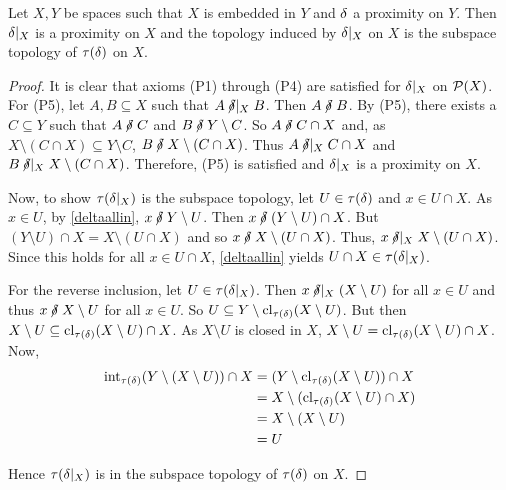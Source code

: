 \begin{proposition}
	\label{subprox}
	Let \( X,Y \) be spaces such that \( X \) is embedded in \( Y \) and \( \mathord{\delta} \) a proximity on \( Y \).  Then \( \mathord{\delta}|_X \) is a proximity on \( X \) and the topology induced by \( \mathord{\delta}|_X \) on \( X \) is the subspace topology of \( \tau(\mathord{\delta}) \) on \( X \).
\end{proposition}
\begin{proof}
	It is clear that axioms (P1) through (P4) are satisfied for \( \mathord{\delta}|_X \) on \( \mathcal{P}(X) \).  For (P5), let \( A,B \subseteq X \) such that \( A \nnearr{X} B \).  Then \( A \nnear B \).  By (P5), there exists a \( C \subseteq Y \) such that \( A \nnear C \) and \( B \nnear Y \setminus C \).  So \( A \nnear C \cap X \) and, as \( X \setminus (C \cap X) \subseteq Y \setminus C \), \( B \nnear X \setminus (C \cap X) \).  Thus \( A \nnearr{X} C \cap X \) and \( B \nnearr{X} X \setminus (C \cap X) \).  Therefore, (P5) is satisfied and \( \mathord{\delta}|_X \) is a proximity on \( X \).
	
	Now, to show \( \tau(\mathord{\delta}|_X) \) is the subspace topology, let \( U \in \tau(\mathord{\delta}) \) and \( x \in U \cap X \).  As \( x \in U \), by \ref{deltaallin}, \( x \nnear Y \setminus U \).  Then \( x \nnear (Y \setminus U) \cap X \).  But \( (Y \setminus U) \cap X = X \setminus (U \cap X) \) and so \( x \nnear X \setminus (U \cap X) \).  Thus, \( x \nnearr{X} X \setminus (U \cap X) \).  Since this holds for all \( x \in U \cap X \), \ref{deltaallin} yields \( U \cap X \in \tau(\mathord{\delta}|_X) \).
	
	For the reverse inclusion, let \( U \in \tau(\mathord{\delta}|_X) \).  Then \( x \nnearr{X} (X \setminus U) \) for all \( x \in U \) and thus \( x \nnear X \setminus U \) for all \( x \in U \).  So \( U \subseteq Y \setminus \operatorname{cl}_{\tau(\mathord{\delta})}(X \setminus U) \).  But then \( X \setminus U \subseteq \operatorname{cl}_{\tau(\mathord{\delta})}(X \setminus U) \cap X \).  As \( X \setminus U \) is closed in \( X \), \( X \setminus U = \operatorname{cl}_{\tau(\mathord{\delta})}(X \setminus U) \cap X \).  Now,
	\begin{align*}
		\operatorname{int}_{\tau(\mathord{\delta})}(Y \setminus (X \setminus U)) \cap X &= (Y \setminus \operatorname{cl}_{\tau(\mathord{\delta})}(X \setminus U)) \cap X \\
		&= X \setminus (\operatorname{cl}_{\tau(\mathord{\delta})}(X \setminus U) \cap X) \\
		&= X \setminus (X \setminus U) \\
		&= U
	\end{align*}
	
	Hence \( \tau(\mathord{\delta}|_X) \) is in the subspace topology of \( \tau(\mathord{\delta}) \) on \( X \).
\end{proof}


